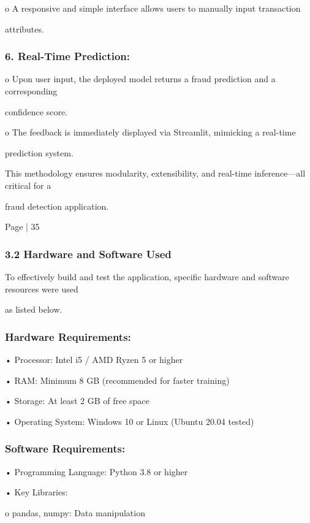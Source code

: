 \documentclass[11pt,a4paper]{article}
\begin{document}
o A responsive and simple interface allows users to manually input transaction 

attributes. 

\subsubsection*{6. Real-Time Prediction: }

o Upon user input, the deployed model returns a fraud prediction and a corresponding 

confidence score. 

o The feedback is immediately displayed via Streamlit, mimicking a real-time 

prediction system. 

This methodology ensures modularity, extensibility, and real-time inference—all critical for a 

fraud detection application. 

Page | 35  

\newpage

\subsubsection*{3.2 Hardware and Software Used }

To effectively build and test the application, specific hardware and software resources were used 

as listed below. 

\subsubsection*{Hardware Requirements: }

• 
Processor: Intel i5 / AMD Ryzen 5 or higher 

• 
RAM: Minimum 8 GB (recommended for faster training) 

• 
Storage: At least 2 GB of free space 

• 
Operating System: Windows 10 or Linux (Ubuntu 20.04 tested) 

\subsubsection*{Software Requirements: }

• 
Programming Language: Python 3.8 or higher 

• 
Key Libraries: 

o pandas, numpy: Data manipulation 
\end{document}
